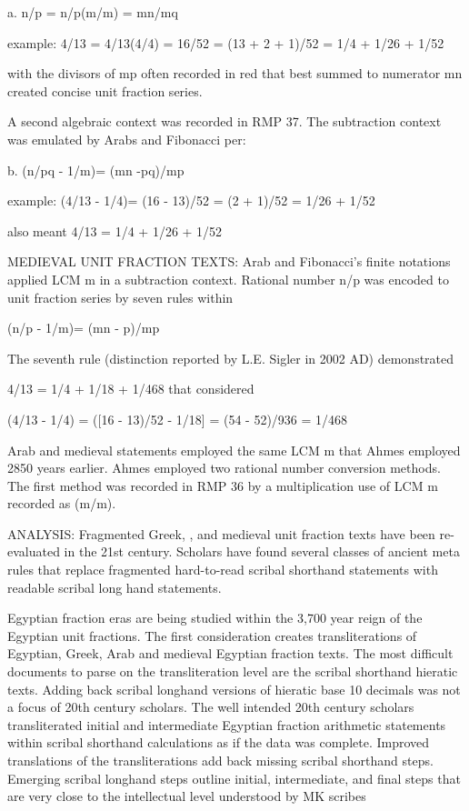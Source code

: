 \documentclass[12pt]{article}
\begin{document}
a. n/p = n/p(m/m) = mn/mq

example: 4/13 = 4/13(4/4) = 16/52 = (13 + 2 + 1)/52 = 1/4 + 1/26 + 1/52

with the divisors of mp often recorded in red that best summed to numerator mn created concise unit fraction series.

A second algebraic context was recorded in RMP 37. The subtraction context was emulated by Arabs and Fibonacci per:

b. (n/pq - 1/m)= (mn -pq)/mp

example: (4/13 - 1/4)= (16 - 13)/52 = (2 + 1)/52 = 1/26 + 1/52

also meant 4/13 = 1/4 + 1/26 + 1/52

MEDIEVAL UNIT FRACTION TEXTS: Arab and Fibonacci's finite notations applied LCM m in a subtraction context. Rational number n/p was encoded to unit fraction series by seven rules within

(n/p - 1/m)= (mn - p)/mp 

The seventh rule (distinction reported by L.E. Sigler in 2002 AD) demonstrated 

4/13 = 1/4 +  1/18 + 1/468 that considered

(4/13 - 1/4) = ([16 - 13)/52 - 1/18] = (54 - 52)/936 = 1/468

Arab and medieval statements employed the same LCM m that Ahmes employed 2850 years earlier. Ahmes employed two rational number conversion methods. The first method was recorded in RMP 36 by a multiplication use of LCM m recorded as (m/m).

ANALYSIS: Fragmented Greek, , and medieval unit fraction texts have been re-evaluated in the 21st century. Scholars have found several classes of ancient meta rules that replace fragmented hard-to-read scribal shorthand statements with readable scribal long hand statements.

Egyptian fraction eras are being studied within the 3,700 year reign of the Egyptian unit fractions. The first consideration creates transliterations of Egyptian, Greek, Arab and medieval Egyptian fraction texts. The most difficult documents to parse on the transliteration level are the scribal shorthand hieratic texts. Adding back scribal longhand versions of hieratic base 10 decimals was not a focus of 20th century scholars. The well intended 20th century scholars transliterated initial and intermediate Egyptian fraction arithmetic statements within scribal shorthand calculations as if the data was complete. Improved translations of the transliterations add back missing scribal shorthand steps. Emerging scribal longhand steps outline initial, intermediate, and final steps that are very close to the intellectual level understood by MK scribes
\end{document}
